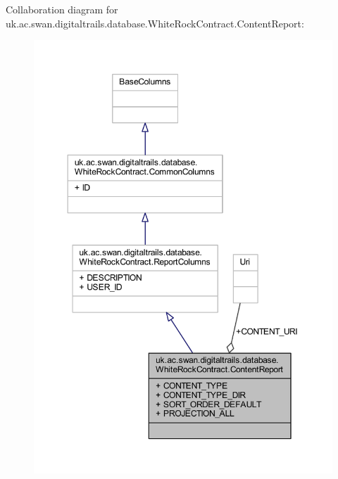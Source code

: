Collaboration diagram for uk.\+ac.\+swan.\+digitaltrails.\+database.\+White\+Rock\+Contract.\+Content\+Report\+:
\nopagebreak
\begin{figure}[H]
\begin{center}
\leavevmode
\includegraphics[width=350pt]{classuk_1_1ac_1_1swan_1_1digitaltrails_1_1database_1_1_white_rock_contract_1_1_content_report__coll__graph}
\end{center}
\end{figure}
